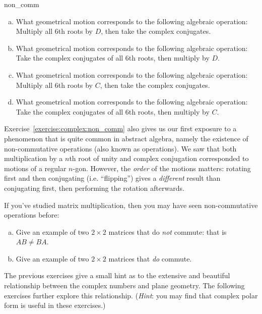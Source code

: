 {\begin{exercise}{non_comm}
\begin{enumerate}[(a)]
\item 
What geometrical motion corresponds to the following algebraic operation:
Multiply all 6th roots by $D$, then take the complex conjugates.

\item 
What geometrical motion corresponds to the following algebraic operation:
\indent \indent Take the complex conjugates of all 6th roots, then multiply by  $D$.

\item 
What geometrical motion corresponds to the following algebraic operation:
\indent \indent Multiply all 6th roots by $C$, then take the complex conjugates.

\item 
What geometrical motion corresponds to the following algebraic operation:
\indent \indent Take the complex conjugates of all 6th roots, then multiply by  $C$.

\end{enumerate}
\end{exercise}

Exercise~\ref{exercise:complex:non_comm} also gives us our first exposure to a phenomenon that is quite common in abstract algebra, namely the existence of non-commutative operations (also known as  operations).
 We saw that both multiplication by a $n$th root of unity and complex conjugation corresponded to motions of a regular $n$-gon. However, the \emph{order} of the motions matters: rotating first and then conjugating (i.e. ``flipping'') gives a \emph{different} result than conjugating first, then performing the rotation afterwards.

\begin{exercise}{56}
If you've studied matrix multiplication, then you may have seen non-commutative operations before: 
\begin{enumerate}[(a)]
\item
Give an example of two $2\times2$ matrices that do \emph{not} commute: that is $AB \neq BA$.
\item
Give an example of two $2\times2$ matrices that \emph{do} commute.
\end{enumerate}
\end{exercise}

The previous exercises give a small hint as to the extensive and beautiful relationship between the complex numbers and plane geometry.  The following exercises further explore  this relationship.  (\emph{Hint}: you may find that complex polar form is useful in these exercises.)

}
